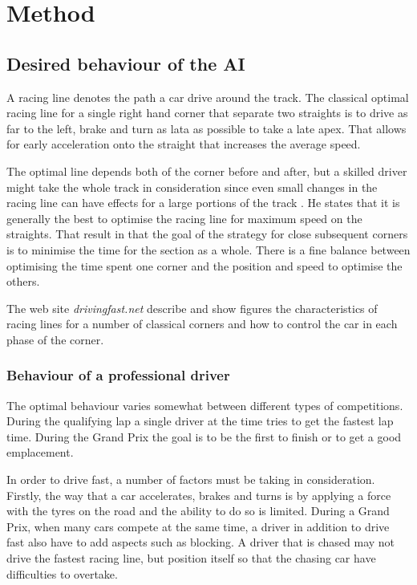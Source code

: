 \chapter{Method}


\section{Desired behaviour of the AI}
A racing line denotes the path a car drive around the track. The classical optimal racing line for a single right hand corner that separate two straights is to drive as far to the left, brake and turn as lata as possible to take a late apex\cite{beckman_racing_line_intro}. That allows for early acceleration onto the straight that increases the average speed.

The optimal line depends both of the corner before and after, but a skilled driver might take the whole track in consideration since even small changes in the racing line can have effects for a large portions of the track \cite{beckman_racing_line_intro}. He states that it is generally the best to optimise the racing line for maximum speed on the straights. That result in that the goal of the strategy for close subsequent corners is to minimise the time for the section as a whole. There is a fine balance between optimising the time spent one corner and the position and speed to optimise the others.

The web site \textit{drivingfast.net} describe and show figures the characteristics of racing lines for a number of classical corners and how to control the car in each phase of the corner\cite{driving_fast_racing_line}\cite{driving_fast_corners}.



\subsection{Behaviour of a professional driver}
The optimal behaviour varies somewhat between different types of competitions. During the qualifying lap a single driver at the time tries to get the fastest lap time. During the Grand Prix the goal is to be the first to finish or to get a good emplacement. 

In order to drive fast, a number of factors must be taking in consideration. Firstly, the way that a car accelerates, brakes and turns is by applying a force with the tyres on the road and the ability to do so is limited\cite{beckman_traction_budget}. During a Grand Prix, when many cars compete at the same time, a driver in addition to drive fast also have to add aspects such as blocking. A driver that is chased may not drive the fastest racing line, but position itself so that the chasing car have difficulties to overtake.

